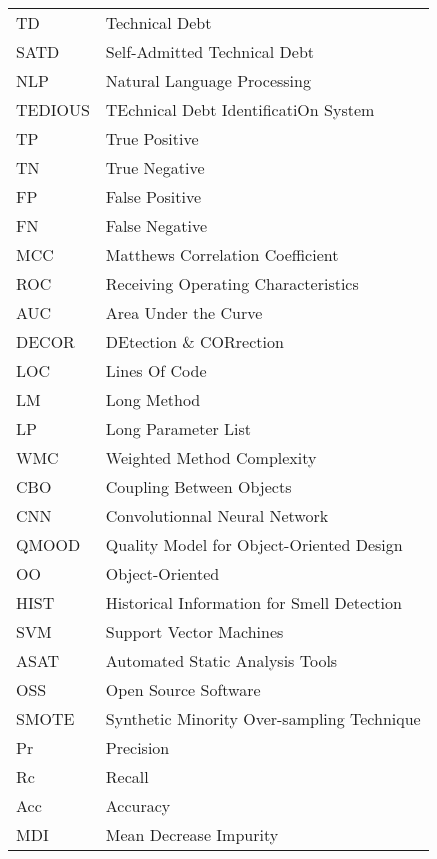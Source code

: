 \begin{longtable}{lp{5in}}
TD			    & Technical Debt\\
SATD		 & Self-Admitted Technical Debt\\
NLP			   & Natural Language Processing\\
TEDIOUS	   & TEchnical Debt IdentificatiOn System\\
TP				& True Positive\\
TN				& True Negative\\
FP				& False Positive\\
FN				& False Negative\\
MCC			  & Matthews Correlation Coefficient\\
ROC			  & Receiving Operating Characteristics\\
AUC			  & Area Under the Curve\\
DECOR	    & DEtection \& CORrection\\
LOC			   & Lines Of Code\\
LM				& Long Method\\
LP				 & Long Parameter List\\
WMC			 & Weighted Method Complexity\\
CBO			  & Coupling Between Objects\\
CNN			  & Convolutionnal Neural Network\\
QMOOD	   & Quality Model for Object-Oriented Design\\
OO			   & Object-Oriented\\
HIST		   & Historical Information for Smell Detection\\
SVM			  & Support Vector Machines\\
ASAT		  & Automated Static Analysis Tools\\
OSS			   & Open Source Software\\
SMOTE		& Synthetic Minority Over-sampling Technique\\
Pr				 & Precision\\
Rc				 & Recall\\
Acc			    & Accuracy\\
MDI			    & Mean Decrease Impurity\\
\end{longtable}

